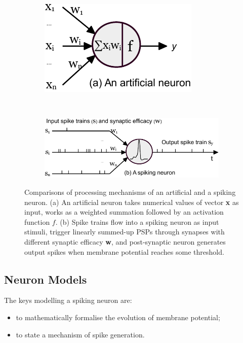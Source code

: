 	\begin{figure}[tb!]
		\centering
		\begin{subfigure}[t]{0.28\textwidth}
			\includegraphics[width=\textwidth]{pics_snn/neuron_ann.pdf}
		\end{subfigure}~
		\begin{subfigure}[t]{0.65\textwidth}
			\includegraphics[width=\textwidth]{pics_snn/neuron_snn.pdf}
		\end{subfigure}
		\caption{Comparisons of processing mechanisms of an artificial and a spiking neuron. (a) An artificial neuron takes numerical values of vector \textbf{x} as input, works as a weighted summation followed by an activation function $f$. (b) Spike trains flow into a spiking neuron as input stimuli, trigger linearly summed-up PSPs through synapses with different synaptic efficacy \textbf{w}, and post-synaptic neuron generates output spikes when membrane potential reaches some threshold.}
		\label{Fig:compare_as}
	\end{figure}

\subsection{Neuron Models}
\label{subsec:neuron_model}
The keys \DIFdelbegin {}\DIFdelend \DIFaddbegin {}\DIFaddend modelling a spiking neuron are: 
\begin{itemize}
	\item to mathematically formalise the evolution of \DIFaddbegin {}\DIFaddend membrane potential;
	\item to state a mechanism of spike generation.
\end{itemize}

